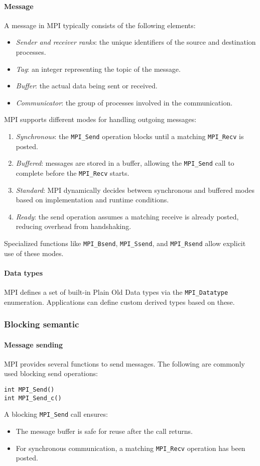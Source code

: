 \paragraph*{Message}
A message in MPI typically consists of the following elements:
\begin{itemize}
    \item \textit{Sender and receiver ranks}: the unique identifiers of the source and destination processes.
    \item \textit{Tag}: an integer representing the topic of the message. 
    \item \textit{Buffer}: the actual data being sent or received.
    \item \textit{Communicator}: the group of processes involved in the communication.
\end{itemize}
\noindent MPI supports different modes for handling outgoing messages:
\begin{enumerate}
    \item \textit{Synchronous}: the \texttt{MPI\_Send} operation blocks until a matching \texttt{MPI\_Recv} is posted.
    \item \textit{Buffered}: messages are stored in a buffer, allowing the \texttt{MPI\_Send} call to complete before the \texttt{MPI\_Recv} starts.
    \item \textit{Standard}: MPI dynamically decides between synchronous and buffered modes based on implementation and runtime conditions.
    \item \textit{Ready}: the send operation assumes a matching receive is already posted, reducing overhead from handshaking.
\end{enumerate}
Specialized functions like \texttt{MPI\_Bsend}, \texttt{MPI\_Ssend}, and \texttt{MPI\_Rsend} allow explicit use of these modes.

\paragraph*{Data types}
MPI defines a set of built-in Plain Old Data types via the \texttt{MPI\_Datatype} enumeration. 
Applications can define custom derived types based on these.

\subsubsection{Blocking semantic}
\paragraph*{Message sending}
MPI provides several functions to send messages. 
The following are commonly used blocking send operations:
\begin{lstlisting}[style=C]
int MPI_Send()
int MPI_Send_c()
\end{lstlisting}
A blocking \texttt{MPI\_Send} call ensures:
\begin{itemize}
    \item The message buffer is safe for reuse after the call returns.
    \item For synchronous communication, a matching \texttt{MPI\_Recv} operation has been posted.
\end{itemize}


